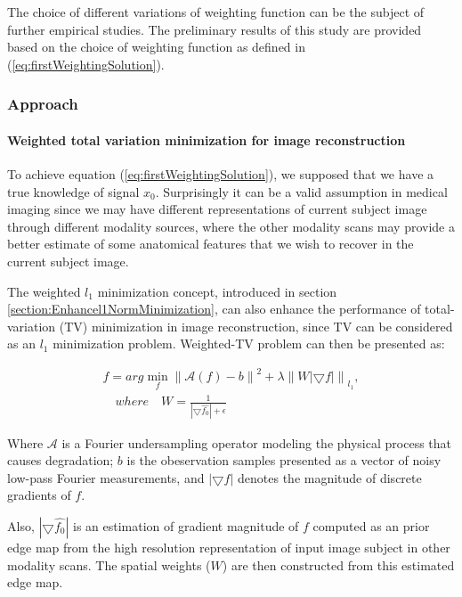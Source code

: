 The choice of different variations of weighting function can be the subject of further empirical studies. The preliminary results of this study are provided based on the choice of weighting function as defined in (\ref{eq:firstWeightingSolution}).
\newline

\subsubsection{Approach}

\paragraph{Weighted total variation minimization for image reconstruction}

To achieve equation (\ref{eq:firstWeightingSolution}), we supposed that we have a true knowledge of signal $x_{0}$. Surprisingly it can be a valid assumption in medical imaging since we may have different representations of current subject image through different modality sources, where the other modality scans may provide a better estimate of some anatomical features that we wish to recover in the current subject image.

The weighted $l_{1}$ minimization concept, introduced in section \ref{section:Enhancel1NormMinimization}, can also enhance the performance of total-variation (TV) minimization in image reconstruction, since TV can be considered as an $l_{1}$ minimization problem. Weighted-TV problem can then be presented as:

\begin{equation}
\label{eq:weightedregularization}
\begin{gathered}
\widehat{f} = arg\min_{f}\left\|\mathcal{A}(f)-b\right\|^{2} + \lambda \left \| W \left | \bigtriangledown f \right | \right \|_{l_{1}}, \\
\quad where \quad W = \frac{1}{\left | \bigtriangledown \widehat{f_{0}} \right |+\epsilon }
\end{gathered}
\end{equation}

Where $\mathcal{A}$ is a Fourier undersampling operator modeling the physical process that causes degradation; $b$ is the obeservation samples presented as a vector of noisy low-pass Fourier measurements, and $\left | \bigtriangledown f \right |$ denotes the magnitude of discrete gradients of $f$.

Also, $\left | \bigtriangledown \widehat{f_{0}} \right |$ is an estimation of gradient magnitude of $f$ computed as an prior edge map from the high resolution representation of input image subject in other modality scans.
The spatial weights ($W$) are then constructed from this estimated edge map.

